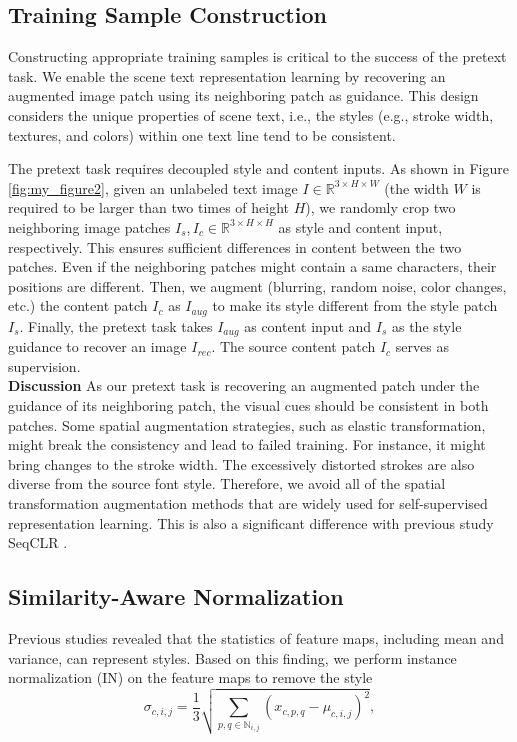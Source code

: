 \documentclass{article}
\begin{document}
\begin{multicols}{2}
        \subsection{Training Sample Construction}
            Constructing appropriate training samples is critical to the success of the pretext task. We enable the scene text representation learning by recovering an augmented image patch using its neighboring patch as guidance. This design considers the unique properties of scene text, i.e., the styles (e.g., stroke width, textures, and colors) within one text line tend to be consistent.
    
            The pretext task requires decoupled style and content inputs. As shown in Figure \ref{fig:my_figure2}, given an unlabeled text image $I \in \mathbb{R}^{3 \times H \times W}$ (the width $W$ is required to be larger than two times of height $H$), we randomly crop two neighboring image patches $I_s, I_c \in \mathbb{R}^{3 \times H \times H}$ as style and content input, respectively. This ensures sufficient differences in content between the two patches. Even if the neighboring patches might contain a same characters, their positions are different. Then, we augment (blurring, random noise, color changes, etc.) the content patch $I_c$ as $I_{aug}$ to make its style different from the style patch $I_s$. Finally, the pretext task takes $I_{aug}$ as content input and $I_s$ as the style guidance to recover an image $I_{rec}$. The source content patch $I_c$ serves as supervision.
            \\
            
            \textbf{Discussion} As our pretext task is recovering an augmented patch under the guidance of its neighboring patch,
            the visual cues should be consistent in both patches. Some
            spatial augmentation strategies, such as elastic transformation, might break the consistency and lead to failed training.
            For instance, it might bring changes to the stroke width.
            The excessively distorted strokes are also diverse from the
            source font style. Therefore, we avoid all of the spatial
            transformation augmentation methods that are widely used
            for self-supervised representation learning. This is also a
            significant difference with previous study SeqCLR \cite{aberdam2021sequence}.
    
        \subsection{Similarity-Aware Normalization}
            Previous studies \cite{huang2017arbitrary,karras2019style} revealed that the statistics of
            feature maps, including mean and variance, can represent
            styles. Based on this finding, we perform instance normalization (IN) \cite{huang2017arbitrary,ulyanov2016instance} on the feature maps to remove the style
        \begin{equation}
        \tag{4}
          \sigma_{c,i,j}= \frac{1}{3} \sqrt{\sum_{p,q\in \mathbb{N}_{i,j}}(x_{c,p,q}-\mu_{c,i,j})^2},  
        \end{equation}
    

\end{multicols}
\end{document}
